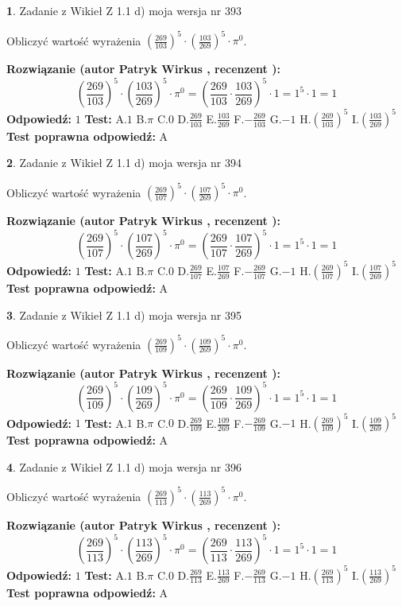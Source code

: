 \documentclass[12pt, a4paper]{article}
\theoremstyle{definition} %
\newtheorem{zad}{}
\newcommand{\zadStart}[1]{\begin{zad}#1\newline}
\newcommand{\zadStop}{\end{zad}}
\newcommand{\rozwStart}[2]{\noindent \textbf{Rozwiązanie (autor #1 , recenzent #2): }\newline}
\newcommand{\rozwStop}{\newline}
\newcommand{\odpStart}{\noindent \textbf{Odpowiedź:}\newline}
\newcommand{\odpStop}{\newline}
\newcommand{\testStart}{\noindent \textbf{Test:}\newline}
\newcommand{\testStop}{\newline}
\newcommand{\kluczStart}{\noindent \textbf{Test poprawna odpowiedź:}\newline}
\newcommand{\kluczStop}{\newline}
\begin{document}
\zadStart{Zadanie z Wikieł Z 1.1 d) moja wersja nr 393}

Obliczyć wartość wyrażenia $(\frac{269}{103})^{5} \cdot (\frac{103}{269})^{5} \cdot \pi^{0}$.
\zadStop
\rozwStart{Patryk Wirkus}{}
$$(\frac{269}{103})^{5} \cdot (\frac{103}{269})^{5} \cdot \pi^{0} = (\frac{269}{103} \cdot \frac{103}{269})^{5} \cdot 1 = 1^{5} \cdot 1 = 1$$
\rozwStop
\odpStart
$1$
\odpStop
\testStart
A.$1$ B.$\pi$ C.$0$ D.$\frac{269}{103}$ E.$\frac{103}{269}$
F.$-\frac{269}{103}$ G.$-1$
H.$(\frac{269}{103})^{5}$
I.$(\frac{103}{269})^{5}$
\testStop
\kluczStart
A
\kluczStop



\zadStart{Zadanie z Wikieł Z 1.1 d) moja wersja nr 394}

Obliczyć wartość wyrażenia $(\frac{269}{107})^{5} \cdot (\frac{107}{269})^{5} \cdot \pi^{0}$.
\zadStop
\rozwStart{Patryk Wirkus}{}
$$(\frac{269}{107})^{5} \cdot (\frac{107}{269})^{5} \cdot \pi^{0} = (\frac{269}{107} \cdot \frac{107}{269})^{5} \cdot 1 = 1^{5} \cdot 1 = 1$$
\rozwStop
\odpStart
$1$
\odpStop
\testStart
A.$1$ B.$\pi$ C.$0$ D.$\frac{269}{107}$ E.$\frac{107}{269}$
F.$-\frac{269}{107}$ G.$-1$
H.$(\frac{269}{107})^{5}$
I.$(\frac{107}{269})^{5}$
\testStop
\kluczStart
A
\kluczStop



\zadStart{Zadanie z Wikieł Z 1.1 d) moja wersja nr 395}

Obliczyć wartość wyrażenia $(\frac{269}{109})^{5} \cdot (\frac{109}{269})^{5} \cdot \pi^{0}$.
\zadStop
\rozwStart{Patryk Wirkus}{}
$$(\frac{269}{109})^{5} \cdot (\frac{109}{269})^{5} \cdot \pi^{0} = (\frac{269}{109} \cdot \frac{109}{269})^{5} \cdot 1 = 1^{5} \cdot 1 = 1$$
\rozwStop
\odpStart
$1$
\odpStop
\testStart
A.$1$ B.$\pi$ C.$0$ D.$\frac{269}{109}$ E.$\frac{109}{269}$
F.$-\frac{269}{109}$ G.$-1$
H.$(\frac{269}{109})^{5}$
I.$(\frac{109}{269})^{5}$
\testStop
\kluczStart
A
\kluczStop



\zadStart{Zadanie z Wikieł Z 1.1 d) moja wersja nr 396}

Obliczyć wartość wyrażenia $(\frac{269}{113})^{5} \cdot (\frac{113}{269})^{5} \cdot \pi^{0}$.
\zadStop
\rozwStart{Patryk Wirkus}{}
$$(\frac{269}{113})^{5} \cdot (\frac{113}{269})^{5} \cdot \pi^{0} = (\frac{269}{113} \cdot \frac{113}{269})^{5} \cdot 1 = 1^{5} \cdot 1 = 1$$
\rozwStop
\odpStart
$1$
\odpStop
\testStart
A.$1$ B.$\pi$ C.$0$ D.$\frac{269}{113}$ E.$\frac{113}{269}$
F.$-\frac{269}{113}$ G.$-1$
H.$(\frac{269}{113})^{5}$
I.$(\frac{113}{269})^{5}$
\testStop
\kluczStart
A
\kluczStop
\end{document}
